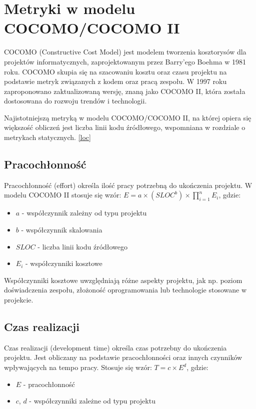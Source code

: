 \section{Metryki w modelu COCOMO/COCOMO II}
COCOMO (Constructive Cost Model) jest modelem tworzenia kosztorysów dla projektów informatycznych, zaprojektowanym przez Barry'ego Boehma w 1981 roku. \cite[]{CocomoBoehm} COCOMO skupia się na szacowaniu kosztu oraz czasu projektu na podstawie metryk związanych z kodem oraz pracą zespołu.
W 1997 roku zaproponowano zaktualizowaną wersję, znaną jako COCOMO II, która została dostosowana do rozwoju trendów i technologii.

Najistotniejszą metryką w modelu COCOMO/COCOMO II, na której opiera się większość obliczeń jest liczba linii kodu źródłowego, wspomniana w rozdziale o metrykach statycznych. \ref{loc}

\subsection{Pracochłonność}
\label{cocomo:effort}
Pracochłonność (effort) określa ilość pracy potrzebną do ukończenia projektu. W modelu COCOMO II stosuje się wzór:
$E = a \times (SLOC^b) \times \prod_{i=1}^{n}E_i$,
gdzie:
\begin{itemize}
    \item $a$ - współczynnik zależny od typu projektu
    \item $b$ - współczynnik skalowania
    \item $SLOC$ - liczba linii kodu źródłowego
    \item $E_i$ - współczynniki kosztowe
\end{itemize}
Współczynniki kosztowe uwzględniają różne aspekty projektu, jak np. poziom doświadczenia zespołu, złożoność oprogramowania lub technologie stosowane w projekcie.

\subsection{Czas realizacji}
Czas realizacji (development time) określa czas potrzebny do ukończenia projektu. Jest obliczany na podstawie pracochłonności oraz innych czynników wpływających na tempo pracy. Stosuje się wzór:
$T = c \times E^d$,
gdzie:
\begin{itemize}
    \item $E$ - pracochłonność
    \item $c$, $d$ - współczynniki zależne od typu projektu
\end{itemize}

